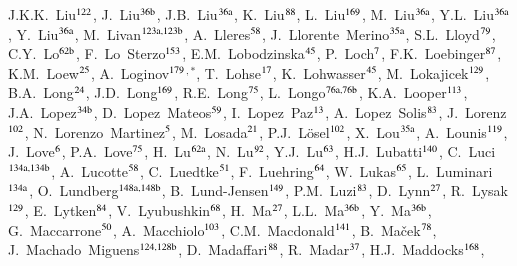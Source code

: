 \begin{flushleft}
J.K.K.~Liu$^\textrm{\scriptsize 122}$,
J.~Liu$^\textrm{\scriptsize 36b}$,
J.B.~Liu$^\textrm{\scriptsize 36a}$,
K.~Liu$^\textrm{\scriptsize 88}$,
L.~Liu$^\textrm{\scriptsize 169}$,
M.~Liu$^\textrm{\scriptsize 36a}$,
Y.L.~Liu$^\textrm{\scriptsize 36a}$,
Y.~Liu$^\textrm{\scriptsize 36a}$,
M.~Livan$^\textrm{\scriptsize 123a,123b}$,
A.~Lleres$^\textrm{\scriptsize 58}$,
J.~Llorente~Merino$^\textrm{\scriptsize 35a}$,
S.L.~Lloyd$^\textrm{\scriptsize 79}$,
C.Y.~Lo$^\textrm{\scriptsize 62b}$,
F.~Lo~Sterzo$^\textrm{\scriptsize 153}$,
E.M.~Lobodzinska$^\textrm{\scriptsize 45}$,
P.~Loch$^\textrm{\scriptsize 7}$,
F.K.~Loebinger$^\textrm{\scriptsize 87}$,
K.M.~Loew$^\textrm{\scriptsize 25}$,
A.~Loginov$^\textrm{\scriptsize 179}$$^{,*}$,
T.~Lohse$^\textrm{\scriptsize 17}$,
K.~Lohwasser$^\textrm{\scriptsize 45}$,
M.~Lokajicek$^\textrm{\scriptsize 129}$,
B.A.~Long$^\textrm{\scriptsize 24}$,
J.D.~Long$^\textrm{\scriptsize 169}$,
R.E.~Long$^\textrm{\scriptsize 75}$,
L.~Longo$^\textrm{\scriptsize 76a,76b}$,
K.A.~Looper$^\textrm{\scriptsize 113}$,
J.A.~Lopez$^\textrm{\scriptsize 34b}$,
D.~Lopez~Mateos$^\textrm{\scriptsize 59}$,
I.~Lopez~Paz$^\textrm{\scriptsize 13}$,
A.~Lopez~Solis$^\textrm{\scriptsize 83}$,
J.~Lorenz$^\textrm{\scriptsize 102}$,
N.~Lorenzo~Martinez$^\textrm{\scriptsize 5}$,
M.~Losada$^\textrm{\scriptsize 21}$,
P.J.~L{\"o}sel$^\textrm{\scriptsize 102}$,
X.~Lou$^\textrm{\scriptsize 35a}$,
A.~Lounis$^\textrm{\scriptsize 119}$,
J.~Love$^\textrm{\scriptsize 6}$,
P.A.~Love$^\textrm{\scriptsize 75}$,
H.~Lu$^\textrm{\scriptsize 62a}$,
N.~Lu$^\textrm{\scriptsize 92}$,
Y.J.~Lu$^\textrm{\scriptsize 63}$,
H.J.~Lubatti$^\textrm{\scriptsize 140}$,
C.~Luci$^\textrm{\scriptsize 134a,134b}$,
A.~Lucotte$^\textrm{\scriptsize 58}$,
C.~Luedtke$^\textrm{\scriptsize 51}$,
F.~Luehring$^\textrm{\scriptsize 64}$,
W.~Lukas$^\textrm{\scriptsize 65}$,
L.~Luminari$^\textrm{\scriptsize 134a}$,
O.~Lundberg$^\textrm{\scriptsize 148a,148b}$,
B.~Lund-Jensen$^\textrm{\scriptsize 149}$,
P.M.~Luzi$^\textrm{\scriptsize 83}$,
D.~Lynn$^\textrm{\scriptsize 27}$,
R.~Lysak$^\textrm{\scriptsize 129}$,
E.~Lytken$^\textrm{\scriptsize 84}$,
V.~Lyubushkin$^\textrm{\scriptsize 68}$,
H.~Ma$^\textrm{\scriptsize 27}$,
L.L.~Ma$^\textrm{\scriptsize 36b}$,
Y.~Ma$^\textrm{\scriptsize 36b}$,
G.~Maccarrone$^\textrm{\scriptsize 50}$,
A.~Macchiolo$^\textrm{\scriptsize 103}$,
C.M.~Macdonald$^\textrm{\scriptsize 141}$,
B.~Ma\v{c}ek$^\textrm{\scriptsize 78}$,
J.~Machado~Miguens$^\textrm{\scriptsize 124,128b}$,
D.~Madaffari$^\textrm{\scriptsize 88}$,
R.~Madar$^\textrm{\scriptsize 37}$,
H.J.~Maddocks$^\textrm{\scriptsize 168}$,
$$
\end{flushleft}
